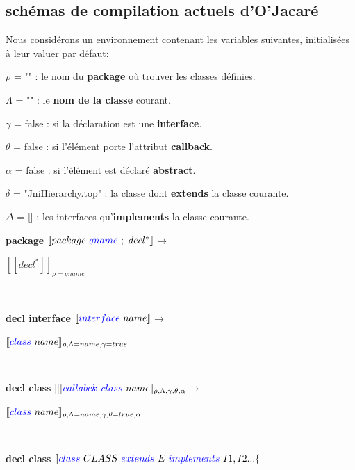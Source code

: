 \documentclass[a4paper, 11pt, notitlepage]{article}
\begin{document}
\subsection{schémas de compilation actuels d'O'Jacaré}

\noindent
Nous considérons un environnement contenant les  variables suivantes, initialisées à leur valuer par défaut: 

$\rho$ = "" : le nom du \textbf{package} où trouver les classes définies.

$\Lambda$ = "" : le \textbf{nom de la classe} courant.

$\gamma$ = false : si la déclaration est une \textbf{interface}.

$\theta$ = false : si l'élément porte l'attribut \textbf{callback}.

$\alpha$ = false : si l'élément est déclaré \textbf{abstract}.

$\delta$ = "JniHierarchy.top" : la classe dont \textbf{extends} la classe courante.

$\Delta$ = [] : les interfaces qu'\textbf{implements} la classe courante.
\ %
\newline
\noindent


\textbf{package}
\newline
\noindent
$[\![ package\ {\color{blue}qname}\ ;\ decl^* ]\!]$$\longrightarrow$

$[\![ decl^* ]\!]_{\rho=qname}$ 

\ 
\newline

\textbf{ decl interface }
\newline
\noindent
$[\![{\color{blue}interface}\  name ]\!]$$\longrightarrow$

$[\![{\color{blue}class}\  name ]\!]_{\rho,\Lambda=name,\gamma=true}$

\ 
\newline

\textbf{ decl class }
\newline
\noindent
$[\![$[$ {\color{blue}callabck}$]${\color{blue} class}\  name ]\!]_{\rho,\Lambda,\gamma,\theta,\alpha}$$\longrightarrow$

$[\![{\color{blue}class}\  name ]\!]_{\rho,\Lambda=name,\gamma,\theta=true,\alpha}$

\ 
\newpage
\noindent

\textbf{ decl class}
\newline
\noindent
$[\![ {\color{blue}class}\ CLASS\ 
 {\color{blue}extends}\  E \ 
 {\color{blue}implements}\  I1,I2... \{$
\end{document}

